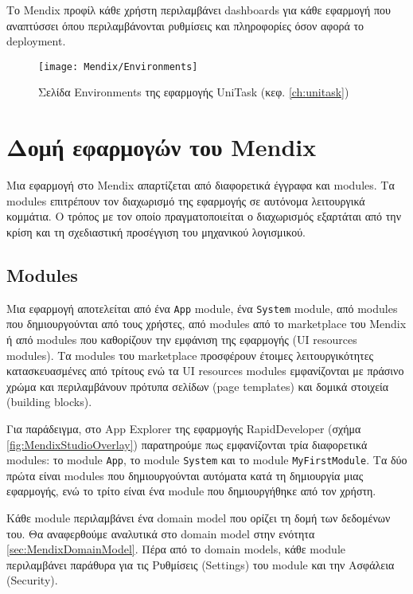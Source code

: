             Το Mendix προφίλ κάθε χρήστη περιλαμβάνει dashboards για κάθε εφαρμογή που αναπτύσσει όπου περιλαμβάνονται ρυθμίσεις και πληροφορίες όσον αφορά το deployment.
            \begin{figure}[h!] \noindent \centering
                \texttt{[image: Mendix/Environments]}
                \caption{\centering Σελίδα Environments της εφαρμογής UniTask (κεφ. \ref{ch:unitask})}
            \end{figure}


    \section{Δομή εφαρμογών του Mendix}
        Μια εφαρμογή στο Mendix απαρτίζεται από διαφορετικά έγγραφα και modules. Τα modules επιτρέπουν τον διαχωρισμό της εφαρμογής σε αυτόνομα λειτουργικά κομμάτια. Ο τρόπος με τον οποίο πραγματοποιείται ο διαχωρισμός εξαρτάται από την κρίση και τη σχεδιαστική προσέγγιση του μηχανικού λογισμικού.

        \subsection{Modules}
            Μια εφαρμογή αποτελείται από ένα \texttt{App} module, ένα \texttt{System} module, από modules που δημιουργούνται από τους χρήστες, από modules από το marketplace του Mendix ή από modules που καθορίζουν την εμφάνιση της εφαρμογής (UI resources modules). Τα modules του marketplace προσφέρουν έτοιμες λειτουργικότητες κατασκευασμένες από τρίτους ενώ τα UI resources modules εμφανίζονται με πράσινο χρώμα και περιλαμβάνουν πρότυπα σελίδων (page templates) και δομικά στοιχεία (building blocks).

            Για παράδειγμα, στο App Explorer της εφαρμογής RapidDeveloper (σχήμα \ref{fig:MendixStudioOverlay}) παρατηρούμε πως εμφανίζονται τρία διαφορετικά modules: το module \texttt{App}, το module \texttt{System} και το module \texttt{MyFirstModule}. Τα δύο πρώτα είναι modules που δημιουργούνται αυτόματα κατά τη δημιουργία μιας εφαρμογής, ενώ το τρίτο είναι ένα module που δημιουργήθηκε από τον χρήστη.

            Κάθε module περιλαμβάνει ένα domain model που ορίζει τη δομή των δεδομένων του. Θα αναφερθούμε αναλυτικά στο domain model στην ενότητα \ref{sec:MendixDomainModel}. Πέρα από το domain models, κάθε module περιλαμβάνει παράθυρα για τις Ρυθμίσεις (Settings) του module και την Ασφάλεια (Security).

